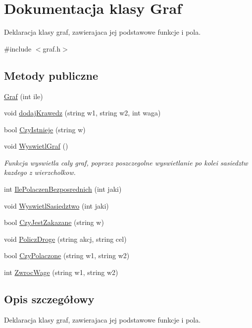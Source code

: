 \hypertarget{class_graf}{\section{Dokumentacja klasy Graf}
\label{class_graf}
}


Deklaracja klasy graf, zawierajaca jej podstawowe funkcje i pola.  




{\ttfamily \#include $<$graf.\-h$>$}

\subsection*{Metody publiczne}
\begin{DoxyCompactItemize}
\item 
\hyperlink{class_graf_a5afda3f183a0337c6784072a92f1665f}{Graf} (int ile)
\item 
void \hyperlink{class_graf_a90ef4a4601908477e59e0cf877cb4e5a}{dodaj\-Krawedz} (string w1, string w2, int waga)
\item 
bool \hyperlink{class_graf_ab72f5cf13712d07a7021ca727d14e43d}{Czy\-Istnieje} (string w)
\item 
void \hyperlink{class_graf_afca25e4667ca9588002cdd364a2b7708}{Wyswietl\-Graf} ()
\begin{DoxyCompactList}\small\item\em Funkcja wyswietla caly graf, poprzez poszczegolne wyswietlanie po kolei sasiedztw kazdego z wierzcholkow. \end{DoxyCompactList}\item 
int \hyperlink{class_graf_ad1d0eaa1de57a75ba8cf6b5672440ce3}{Ile\-Polaczen\-Bezposrednich} (int jaki)
\item 
void \hyperlink{class_graf_a820956405edd4b5fa006b2f46767d7ab}{Wyswietl\-Sasiedztwo} (int jaki)
\item 
bool \hyperlink{class_graf_a3bc81888fa952be6267dab6390223c63}{Czy\-Jest\-Zakazane} (string w)
\item 
void \hyperlink{class_graf_ac046648ca44498f23160b476e0068d79}{Policz\-Droge} (string akcj, string cel)
\item 
bool \hyperlink{class_graf_a3654353092430ab66f28af554fa45908}{Czy\-Polaczone} (string w1, string w2)
\item 
int \hyperlink{class_graf_a03d5e2a34a50d31fff142496dad1b15f}{Zwroc\-Wage} (string w1, string w2)
\end{DoxyCompactItemize}


\subsection{Opis szczegółowy}
Deklaracja klasy graf, zawierajaca jej podstawowe funkcje i pola. 


